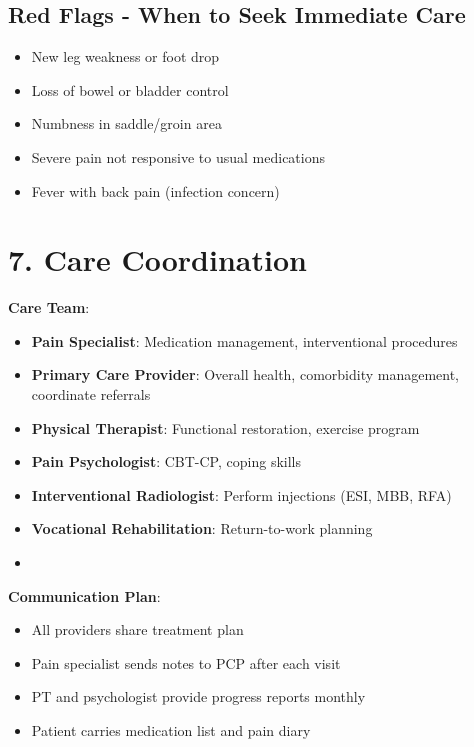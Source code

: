 \documentclass[11pt,letterpaper]{article}
\begin{document}
\subsection*{Red Flags - When to Seek Immediate Care}

\begin{itemize}[leftmargin=*]
    \item New leg weakness or foot drop
    \item Loss of bowel or bladder control
    \item Numbness in saddle/groin area
    \item Severe pain not responsive to usual medications
    \item Fever with back pain (infection concern)
\end{itemize}

\section*{7. Care Coordination}

\textbf{Care Team}:
\begin{itemize}[leftmargin=*]
    \item \textbf{Pain Specialist}: Medication management, interventional procedures
    \item \textbf{Primary Care Provider}: Overall health, comorbidity management, coordinate referrals
    \item \textbf{Physical Therapist}: Functional restoration, exercise program
    \item \textbf{Pain Psychologist}: CBT-CP, coping skills
    \item \textbf{Interventional Radiologist}: Perform injections (ESI, MBB, RFA)
    \item \textbf{Vocational Rehabilitation}: Return-to-work planning
    \item [Neurosurgery/Spine Surgeon: Consult if surgical candidacy changes]
\end{itemize}

\textbf{Communication Plan}:
\begin{itemize}[leftmargin=*]
    \item All providers share treatment plan
    \item Pain specialist sends notes to PCP after each visit
    \item PT and psychologist provide progress reports monthly
    \item Patient carries medication list and pain diary
\end{itemize}
\end{document}
